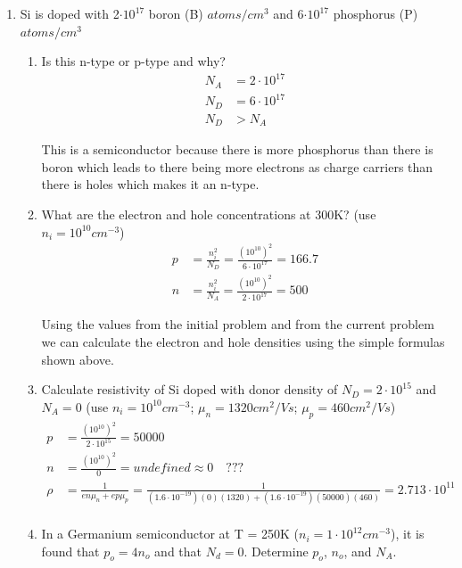 \documentclass{article}
\begin{document}
\begin{enumerate}
\item Si is doped with 2$\cdot 10^{17}$ boron (B) $atoms/cm^3$ and 6$\cdot10^{17}$ phosphorus (P) $atoms/cm^3$
\begin{enumerate}
    \item Is this n-type or p-type and why?
    \begin{align}
        N_A &= 2\cdot 10^{17}\\
        N_D &= 6\cdot10^{17}\\
        N_D &> N_A
    \end{align}
    \begin{center}
        This is a  semiconductor because there is more phosphorus than there is boron which leads to there being more electrons as charge carriers than there is holes which makes it an n-type.
    \end{center}
    \item What are the electron and hole concentrations at 300K? (use $n_i = 10^{10} cm^{-3}$)
    \begin{align}
        p &= \frac{n_i^2}{N_D} =  \frac{(10^{10})^2}{6\cdot10^{17}} = \boxed{166.7}\\
        n &= \frac{n_i^2}{N_A} = \frac{(10^{10})^2}{2\cdot10^{17}} = \boxed{500}
    \end{align}
    \begin{center}
        Using the values from the initial problem and from the current problem we can calculate the electron and hole densities using the simple formulas shown above.
    \end{center}
    \item Calculate resistivity of Si doped with donor density of $N_D = 2 \cdot 10^{15}$ and $N_A = 0$ (use $n_i = 10^{10} cm^{-3}$; $\mu_n = 1320 cm^2/Vs$; $\mu_p = 460 cm^2/Vs$)
    \begin{align}
        p &= \frac{(10^{10})^2}{2\cdot10^{15}} = 50000\\
        n &= \frac{(10^{10})^2}{0} = undefined \approx 0 \quad ???\\
        \rho &= \frac{1}{en\mu_n + ep\mu_p} = \frac{1}{(1.6\cdot10^{-19})(0)(1320) + (1.6\cdot10^{-19})(50000)(460)} = \boxed{2.713\cdot 10^{11}}\\
    \end{align}
    \item In a Germanium semiconductor at T = 250K ($n_i = 1\cdot10^{12} cm^{-3}$), it is found that $p_o = 4n_o$ and that $N_d = 0$. Determine $p_o$, $n_o$, and $N_A$.

\end{enumerate}
\end{enumerate}
\end{document}

